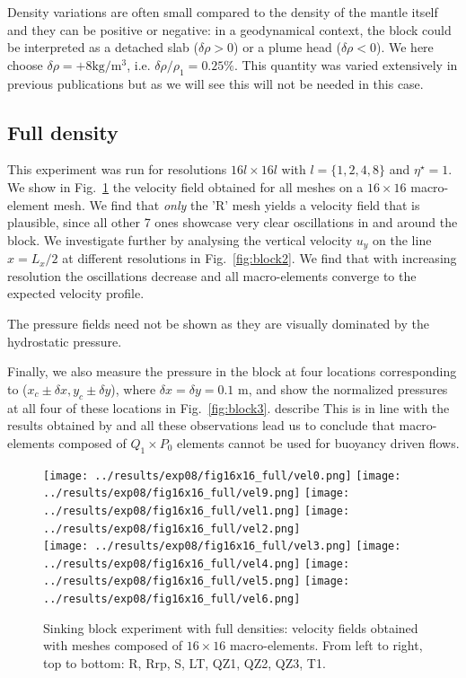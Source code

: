 \documentclass[a4paper,12pt]{article}
\begin{document}
Density variations are often small compared to the density of the mantle itself
and they can be positive or negative: in a geodynamical context, 
the block could be interpreted as a detached slab
($\delta\rho>0$) or a plume head ($\delta\rho<0$). 
We here choose $\delta \rho=+8\si{\kg\per\cubic\metre}$, i.e. $\delta \rho/\rho_1 = 0.25\%$.
This quantity was varied extensively in previous publications but as we will see 
this will not be needed in this case. 

\subsection{Full density}

This experiment was run for resolutions $16l\times 16l$ with $l=\{1,2,4,8\}$ and $\eta^\star=1$. 
We show in Fig.~\ref{fig:block1} the velocity field obtained for all meshes on 
a $16\times 16$ macro-element mesh. 
We find that {\it only} the 'R' mesh yields a velocity field that is plausible, 
since all other 7 ones showcase very clear oscillations in and around the block.
We investigate further by analysing the vertical velocity $u_y$
on the line $x=L_x/2$ at different resolutions in Fig.~\ref{fig:block2}.
We find that with increasing resolution the oscillations decrease and 
all macro-elements converge to the expected velocity profile.

The pressure fields need not be shown as they are visually dominated 
by the hydrostatic pressure.

Finally, we also measure the pressure in the block 
at four locations corresponding to ($x_c \pm \delta x, y_c \pm \delta y$),
where $\delta x = \delta y = 0.1$ m, and show the normalized pressures
at all four of these locations in Fig.~\ref{fig:block3}.
{\color{red} describe}
This is in line with the results obtained by \cite{thba22} and 
all these observations lead us to conclude that 
macro-elements composed of $Q_1 \times P_0$ elements cannot be used for buoyancy driven flows.

\begin{figure}[t]
\centering
\texttt{[image: ../results/exp08/fig16x16\_full/vel0.png]} %
\texttt{[image: ../results/exp08/fig16x16\_full/vel9.png]} %
\texttt{[image: ../results/exp08/fig16x16\_full/vel1.png]} %
\texttt{[image: ../results/exp08/fig16x16\_full/vel2.png]}\\ %
\texttt{[image: ../results/exp08/fig16x16\_full/vel3.png]} %
\texttt{[image: ../results/exp08/fig16x16\_full/vel4.png]} %
\texttt{[image: ../results/exp08/fig16x16\_full/vel5.png]} %
\texttt{[image: ../results/exp08/fig16x16\_full/vel6.png]} %
\caption{Sinking block experiment with full densities: velocity fields 
obtained with meshes composed of $16\times 16$ macro-elements.
From left to right, top to bottom: R, Rrp, S, LT, QZ1, QZ2, QZ3, T1.\label{fig:block1}}
\end{figure}
\end{document}
